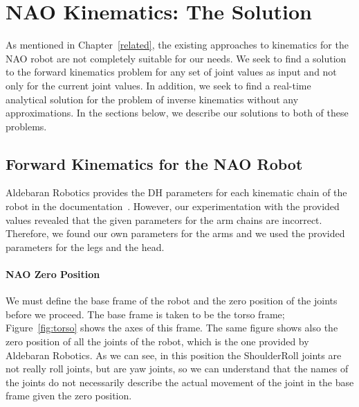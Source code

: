 \chapter{NAO Kinematics: The Solution}
\label{approach}

As mentioned in Chapter~\ref{related}, the existing approaches to kinematics for the NAO robot are not completely suitable for our needs. We seek to find a solution to the forward kinematics problem for any set of joint values as input and not only for the current joint values. In addition, we seek to find a real-time analytical solution for the problem of inverse kinematics without any approximations. In the sections below, we describe our solutions to both of these problems.


\section{Forward Kinematics for the NAO Robot}
Aldebaran Robotics provides the DH parameters for each kinematic chain of the robot in the documentation~\cite{AldebaranNaoDoc}. However, our experimentation with the provided values revealed that the given parameters for the arm chains are incorrect. Therefore, we found our own parameters for the arms and we used the provided parameters for the legs and the head.


\subsubsection*{NAO Zero Position}
We must define the base frame of the robot and the zero position of the joints before we proceed. The base frame is taken to be the torso frame; Figure~\ref{fig:torso} shows the axes of this frame. The same figure shows also the zero position of all the joints of the robot, which is the one provided by Aldebaran Robotics. As we can see, in this position the ShoulderRoll joints are not really roll joints, but are yaw joints, so we can understand that the names of the joints do not necessarily describe the actual movement of the joint in the base frame given the zero position.


